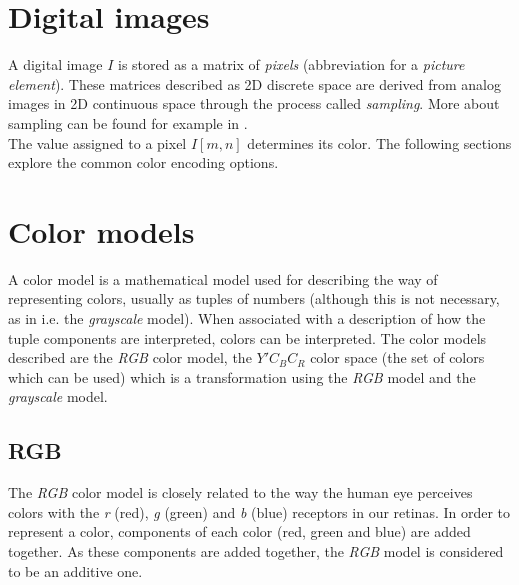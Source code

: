 \documentclass[thesis=M,english]{FITthesis}[2012/10/20]
\begin{document}
\section{Digital images}
A digital image $I$ is stored as a matrix of \emph{pixels} (abbreviation for a \emph{picture
element}). These matrices described as 2D discrete space are derived from analog
images in 2D continuous space through the process called \emph{sampling}. More about
sampling can be found for example in \cite{img:img-processing}.
\\

The value assigned to a pixel $I[m,n]$ determines its color. The following sections
explore the common color encoding options.


\section{Color models}
A color model is a mathematical model used for describing the way of representing
colors, usually as tuples of numbers (although this is not necessary, as in i.e.
the \emph{grayscale} model). When associated with a description of how the tuple
components are interpreted, colors can be interpreted. The color models described
are the \emph{RGB} color model, the $Y'C_{B}C_{R}$ color space (the set of colors
which can be used) which is a transformation using the \emph{RGB} model and the
\emph{grayscale} model.


\subsection{RGB}
The \emph{RGB} color model is closely related to the way the human eye perceives colors
with the \emph{r} (red), \emph{g} (green) and \emph{b} (blue) receptors in our retinas.\cite{img:color-theory}
In order to represent a color, components of each color (red, green and blue) are added together.
As these components are added together, the \emph{RGB} model is considered to be an additive one.
\\
\end{document}
